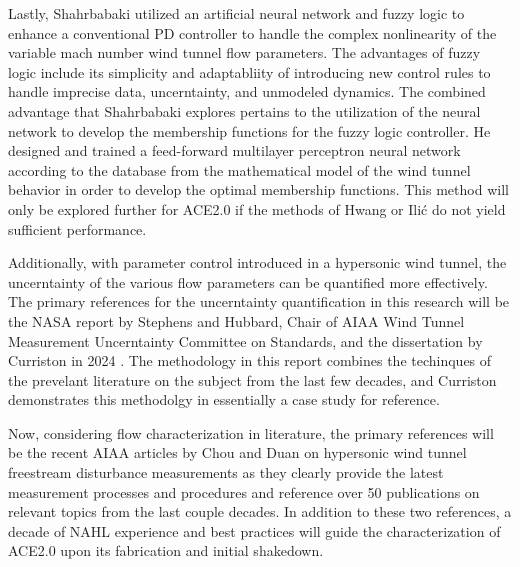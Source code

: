 Lastly, Shahrbabaki utilized an artificial neural network and fuzzy logic to enhance a conventional PD controller to handle the complex nonlinearity of the variable mach number wind tunnel flow parameters. The advantages of fuzzy logic include its simplicity and adaptabliity of introducing new control rules to handle imprecise data, uncerntainty, and unmodeled dynamics. The combined advantage that Shahrbabaki explores pertains to the utilization of the neural network to develop the membership functions for the fuzzy logic controller. He designed and trained a feed-forward multilayer perceptron neural network according to the database from the mathematical model of the wind tunnel behavior in order to develop the optimal membership functions. This method will only be explored further for ACE2.0 if the methods of Hwang or Ili\'c do not yield sufficient performance.

Additionally, with parameter control introduced in a hypersonic wind tunnel, the uncerntainty of the various flow parameters can be quantified more effectively. The primary references for the uncerntainty quantification in this research will be the NASA report by Stephens \cite{stephens-hubbard} and Hubbard, Chair of AIAA Wind Tunnel Measurement Uncerntainty Committee on Standards, and the dissertation by Curriston in 2024 \cite{curriston}. The methodology in this report combines the techinques of the prevelant literature on the subject from the last few decades, and Curriston demonstrates this methodolgy in essentially a case study for reference.

Now, considering flow characterization in literature, the primary references will be the recent AIAA articles by Chou \cite{chou} and Duan \cite{duan} on hypersonic wind tunnel freestream disturbance measurements as they clearly provide the latest measurement processes and procedures and reference over 50 publications on relevant topics from the last couple decades. In addition to these two references, a decade of NAHL experience and best practices will guide the characterization of ACE2.0 upon its fabrication and initial shakedown.

